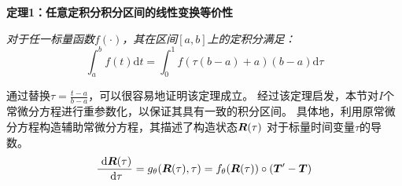 \textbf{定理1：任意定积分积分区间的线性变换等价性}

\textit{对于任一标量函数$f(\cdot)$，其在区间$[a, b]$上的定积分满足：}
\begin{equation}
\int_{a}^{b}f(t) \text{d}t=\int_{0}^1f(\tau(b-a)+a) (b-a)\text{d}\tau
\end{equation}

通过替换$\tau = \frac{t-a}{b-a}$，可以很容易地证明该定理成立。
经过该定理启发，本节对$I$个常微分方程进行重参数化，以保证其具有一致的积分区间。
具体地，利用原常微分方程构造辅助常微分方程，其描述了构造状态$\boldsymbol{R}(\tau)$ 对于标量时间变量$\tau$的导数。
\begin{equation}
    \frac{\mathrm{~d}\boldsymbol R(\tau)}{\mathrm{~d}\tau}=g_{\theta}(\boldsymbol R(\tau), \tau)=f_\theta(\boldsymbol R(\tau))\circ (\boldsymbol{T}'-\boldsymbol{T})
\label{equ:construct_ode}
\end{equation}

